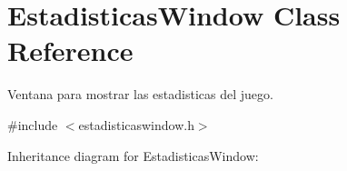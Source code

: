\hypertarget{classEstadisticasWindow}{}\section{Estadisticas\+Window Class Reference}
\label{classEstadisticasWindow}


Ventana para mostrar las estadisticas del juego.  




{\ttfamily \#include $<$estadisticaswindow.\+h$>$}



Inheritance diagram for Estadisticas\+Window\+:
